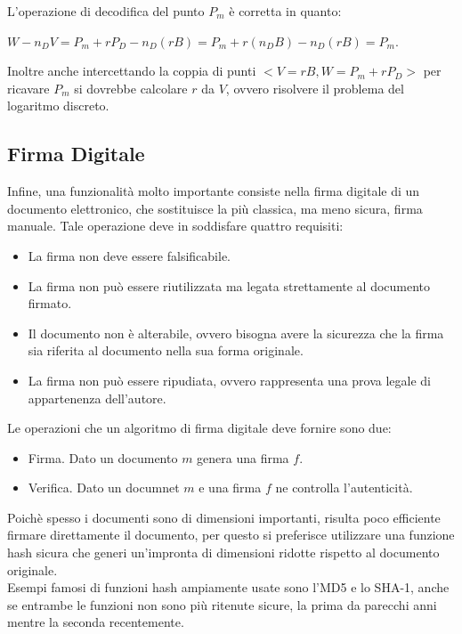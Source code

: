 \documentclass{article}
\begin{document}
	L'operazione di decodifica del punto $P_{m}$ è corretta in quanto:
	
	$W - n_{D}V = P_{m} + rP_{D} - n_{D}(rB) = P_{m} + r(n_{D}B) - n_{D}(rB) = P_{m}$.
	
	Inoltre anche intercettando la coppia di punti $<V = rB, W = P_{m} + rP_{D}>$
	per ricavare $P_{m}$ si dovrebbe calcolare $r$ da $V$, ovvero risolvere il problema del
	logaritmo discreto.
	
	\subsection{Firma Digitale}
	
	Infine, una funzionalità molto importante consiste nella firma digitale di un documento elettronico,
	che sostituisce la più classica, ma meno sicura, firma manuale. Tale operazione deve in soddisfare quattro requisiti:
	
	\begin{itemize}
		\item La firma non deve essere falsificabile.
		\item La firma non può essere riutilizzata ma legata strettamente al documento firmato.
		\item Il documento non è alterabile, ovvero bisogna avere la sicurezza che la firma sia riferita al documento nella sua forma originale.
		\item La firma non può essere ripudiata, ovvero rappresenta una prova legale di appartenenza dell'autore.
	\end{itemize}
	
	Le operazioni che un algoritmo di firma digitale deve fornire sono due:
	\begin{itemize}
		\item Firma. Dato un documento $m$ genera una firma $f$.
		\item Verifica. Dato un documnet $m$ e una firma $f$ ne controlla l'autenticità.
	\end{itemize}
	
	Poichè spesso i documenti sono di dimensioni importanti, risulta poco efficiente firmare direttamente il documento,
	per questo si preferisce utilizzare una funzione hash sicura che generi un'impronta di dimensioni ridotte rispetto al documento originale.\\
	
	Esempi famosi di funzioni hash ampiamente usate sono l'MD5 e lo SHA-1, anche se entrambe le funzioni non sono più ritenute
	sicure, la prima da parecchi anni mentre la seconda recentemente.\\
	
\end{document}
